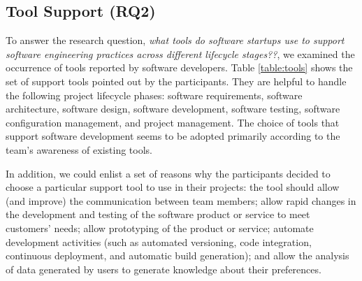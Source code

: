 \documentclass[runningheads]{llncs}
\begin{document}
\subsection{Tool Support (RQ2)} 

To answer the research question, \textit{what tools do software startups use to support software engineering practices across different lifecycle stages??}, we examined the occurrence of tools reported by software developers. Table \ref{table:tools} shows the set of support tools pointed out by the participants. They are helpful to handle the following project lifecycle phases: software requirements, software architecture, software design, software development, software testing, software configuration management, and project management. The choice of tools that support software development seems to be adopted primarily according to the team's awareness of existing tools.

In addition, we could enlist a set of reasons why the participants decided to choose a particular support tool to use in their projects: the tool should allow (and improve) the communication between team members; allow rapid changes in the development and testing of the software product or service to meet customers' needs; allow prototyping of the product or service; automate development activities (such as automated versioning, code integration, continuous deployment, and automatic build generation); and allow the analysis of data generated by users to generate knowledge about their preferences.
\end{document}
